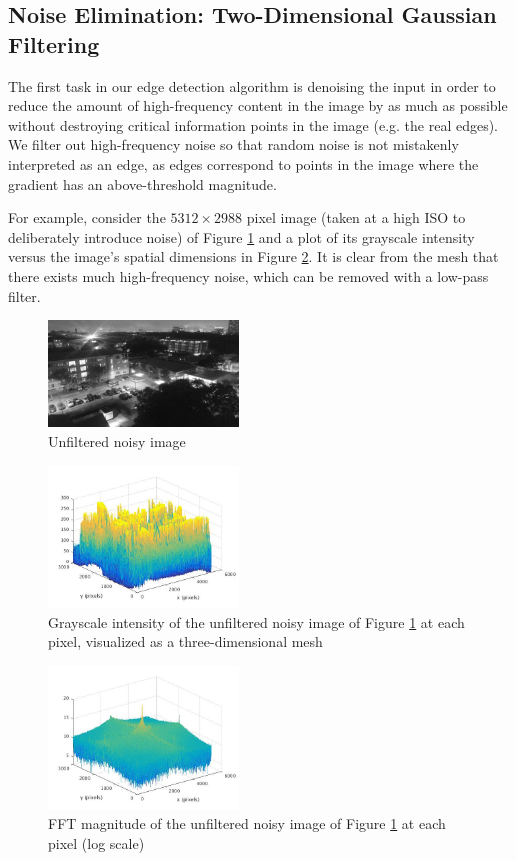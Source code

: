 \documentclass[journal]{IEEEtran}
\begin{document}
\subsection{Noise Elimination: Two-Dimensional Gaussian Filtering}
The first task in our edge detection algorithm is denoising the input in order to reduce the amount of high-frequency content in the image by as much as possible without destroying critical information points in the image (e.g. the real edges). We filter out high-frequency noise so that random noise is not mistakenly interpreted as an edge, as edges correspond to points in the image where the gradient has an above-threshold magnitude. \par
For example, consider the $5312 \times 2988$ pixel image (taken at a high ISO to deliberately introduce noise) of Figure \ref{noisy-image} and a plot of its grayscale intensity versus the image's spatial dimensions in Figure \ref{noisy-image-mesh}. It is clear from the mesh that there exists much high-frequency noise, which can be removed with a low-pass filter.
\begin{figure}[H]
	\centering
	\includegraphics[width=0.45\textwidth]{noisy_image.jpg}
	\caption{Unfiltered noisy image}
    \label{noisy-image}
\end{figure}
\begin{figure}[h]
	\centering
	\includegraphics[width=0.45\textwidth]{noisy_image_mesh.jpg}
	\caption{Grayscale intensity of the unfiltered noisy image of Figure \ref{noisy-image} at each pixel, visualized as a three-dimensional mesh}
    \label{noisy-image-mesh}
\end{figure}
\begin{figure}[h]
	\centering
	\includegraphics[width=0.45\textwidth]{fft_noisy_image.jpg}
	\caption{FFT magnitude of the unfiltered noisy image of Figure \ref{noisy-image} at each pixel (log scale)}
    \label{noisy-image-fft}
\end{figure}
\end{document}
